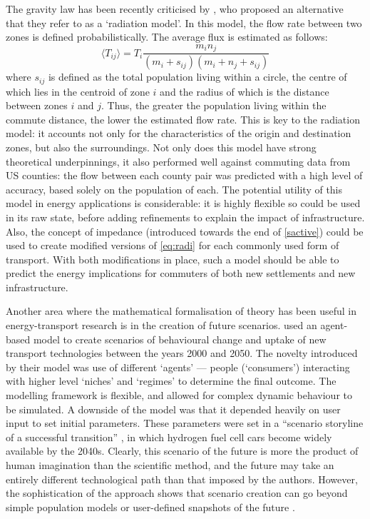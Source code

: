 \documentclass[a4paper, 11pt, twoside]{Thesis}
\begin{document}
The gravity law has been recently criticised by
\citet{Simini2012}, who proposed an alternative that they refer to as a
`radiation model'. In this model, the flow rate between two zones is defined
probabilistically. The average flux is estimated as follows:
\begin{equation}
\langle T_{ij} \rangle = T_i \frac{m_{i} n_{j}} {(m_i + s_{ij})(m_i + n_j + s_{ij}) }
\label{eq:radi}
\end{equation}
where $s_{ij}$ is defined as the total population living within a circle, the
centre of which lies in the centroid of zone $i$ and the radius of which is
the distance between zones $i$ and $j$. Thus, the greater the population
living within the commute distance, the lower the estimated flow rate.
This is key to the radiation model: it accounts not only for the characteristics
of the origin and destination zones, but also the surroundings.
Not only does this model have strong theoretical underpinnings, it also
performed well against commuting data from US counties: the flow between
each county pair was predicted with a high level of accuracy, based solely
on the population of each. The potential utility of this model in
energy applications is considerable: it is highly flexible so could be used in its
raw state, before adding refinements to explain the impact of infrastructure.
Also, the concept of impedance (introduced towards the end of \cref{sactive})
could be used to create modified versions of \cref{eq:radi}
for each commonly used form of transport. With both modifications in place,
such a model should be able to predict the energy implications for commuters of both
new settlements and new infrastructure.


Another area where the mathematical formalisation of theory has been useful in
energy-transport research is in the creation of future scenarios.
\citet{Kohler2009} used an agent-based model to create scenarios of behavioural
change and uptake of new transport technologies between the years 2000 and
2050. The novelty introduced by their model was use of different `agents' ---
people (`consumers') interacting with higher level `niches' and `regimes' to
determine the final outcome. The modelling framework is flexible, and allowed
for complex dynamic behaviour to be simulated. A downside of the model was
that it depended heavily on user input to set initial parameters. These
parameters were set in a
``scenario storyline of a successful transition'' \citep[p.~2988]{Kohler2009},
in which hydrogen fuel
cell cars become widely available by the 2040s. Clearly, this scenario of the
future is more the product of human imagination than the scientific method,
and the future may take an entirely different technological path than that
imposed by the authors.
However, the sophistication of the approach shows that scenario creation
can go beyond simple population models \citep{Lovelace2011-assessing} or
user-defined snapshots of the future \citep{Akerman2006}.
\end{document}
